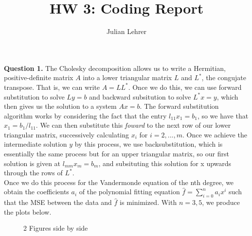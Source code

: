 \documentclass{article}
\title{HW 3: Coding Report}
\date{}
\author{Julian Lehrer}
\begin{document}
\maketitle
\textbf{Question 1.} The Cholesky decomposition allows us to write a Hermitian, positive-definite matrix $A$ into a lower triangular matrix $L$ and $L^*$, the congujate transpose. That is, we can write $A = LL^*$. Once we do this, we can use forward substitution to solve $Ly=b$ and backward subsitution to solve $L^*x = y$, which then gives us the solution to a system $Ax=b$. The forward substitution algorithm works by considering the fact that the entry $l_{11}x_{1} = b_{1}$, so we have that $x_{1} = b_{1}/l_{11}$. We can then substitute this \textit{foward} to the next row of our lower triangular matrix, successively calculating $x_{i}$ for $i=2,...,m$. Once we achieve the intermediate solution $y$ by this process, we use backsubstitution, which is essentially the same process but for an upper triangular matrix, so our first solution is given at $l_{mm}x_{m} = b_{m}$, and subsituting this solution for x upwards through the rows of $L^*$. \\

Once we do this process for the Vandermonde equation of the nth degree, we obtain the coefficients $a_i$ of the polynomial fitting equation $\hat{f} = \sum_{i=0}^{n} a_i x^{i}$ such that the MSE between the data and $\hat{f}$ is minimized. With $n=3,5$, we produce the plots below.

\begin{figure}[H]
    \centering
    \qquad
    \caption{2 Figures side by side}%
    \label{3rd ad 5th degree fitting polynomials, double precision}%
\end{figure}
\end{document}
